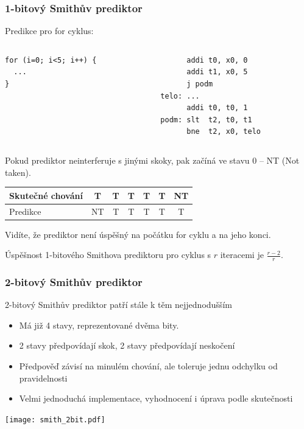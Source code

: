 \documentclass{beamer}
\begin{document}
\begin{frame}[fragile]
\frametitle{1-bitový Smithův prediktor}

Predikce pro for cyklus:

\begin{columns}[T]
\begin{column}{0.35\textwidth}
\begin{verbatim}
for (i=0; i<5; i++) {
  ...
}
\end{verbatim}
\end{column}
\hfill
\begin{column}{0.45\textwidth}
\begin{verbatim}
      addi t0, x0, 0
      addi t1, x0, 5
      j podm
telo: ...
      addi t0, t0, 1
podm: slt  t2, t0, t1
      bne  t2, x0, telo
\end{verbatim}
\end{column}
\end{columns}
\bigskip
Pokud prediktor neinterferuje s jinými skoky, pak začíná ve stavu 0 -- NT (Not taken).

\begin{tabular}{|l|c|c|c|c|c|c|}\hline
Skutečné chování & T & T & T & T & T & NT\\ \hline
Predikce         & {\color{red}NT} & T & T & T & T & {\color{red}T}\\ \hline
\end{tabular}

Vidíte, že prediktor není úspěšný na počátku for cyklu a na jeho konci.

Úspěšnost 1-bitového Smithova prediktoru pro cyklus s $r$ iteracemi je $\frac{r-2}{r}$.
\end{frame}


\begin{frame}
\frametitle{2-bitový Smithův prediktor}

2-bitový Smithův prediktor patří stále k těm nejjednodušším
\begin{itemize}
\item Má již 4 stavy, reprezentované dvěma bity.
\item 2 stavy předpovídají skok, 2 stavy předpovídají neskočení
\item Předpověď závisí na minulém chování, ale toleruje jednu odchylku od pravidelnosti
\item Velmi jednoduchá implementace, vyhodnocení i úprava podle skutečnosti
\end{itemize}

\begin{center}
\texttt{[image: smith\_2bit.pdf]}
\end{center}
\end{frame}
\end{document}
